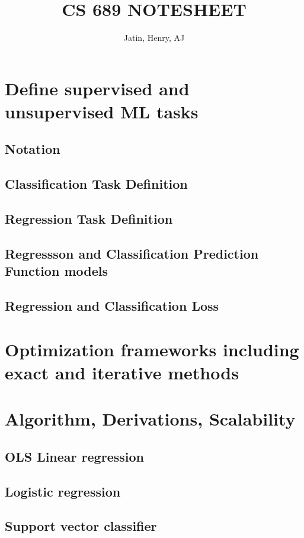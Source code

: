 \documentclass[11pt]{article}
\author{Jatin, Henry, AJ}
\title{CS 689 NOTESHEET}
\begin{document}
    \maketitle
    \section{Define supervised and unsupervised ML tasks}
    \subsection{Notation}
    
    \subsection{Classification Task Definition}
    \subsection{Regression Task Definition}
    \subsection{Regressson and Classification Prediction Function models}
    \subsection{Regression and Classification Loss}


    \section{Optimization frameworks including exact and iterative methods}
        


    \section{Algorithm, Derivations, Scalability}

    \subsection{OLS Linear regression}
    \subsection{Logistic regression}
    \subsection{Support vector classifier}
\end{document}
